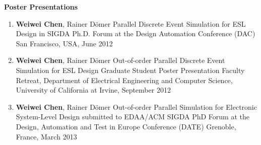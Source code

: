 \vspace{5mm}
{\textbf{\large Poster Presentations}}
\vspace{-2mm}
\begin{enumerate}
\item
	\mypub
	{\textbf{Weiwei Chen}, Rainer D\"{o}mer}
	{Parallel Discrete Event Simulation for ESL Design} 
	{in } 
	{SIGDA Ph.D. Forum at the Design Automation Conference (DAC)}
	{San Francisco, USA, June 2012}
	
\item	
	\mypub
	{\textbf{Weiwei Chen}, Rainer D\"{o}mer}
	{Out-of-order Parallel Discrete Event Simulation for ESL Design}
	{}
	{Graduate Student Poster Presentation}
	{Faculty Retreat, Department of Electrical Engineering and Computer Science, University of California at Irvine, September 2012}
	
\item	
	\mypub
	{\textbf{Weiwei Chen}, Rainer D\"{o}mer}
	{Out-of-order Parallel Simulation for Electronic System-Level Design}
	{submitted to }
	{EDAA/ACM SIGDA PhD Forum at the Design, Automation and Test in Europe Conference (DATE)}
	{Grenoble, France, March 2013}

\end{enumerate}




